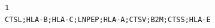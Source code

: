 \documentclass[
  letterpaper,
  DIV=11,
  numbers=noendperiod]{scrartcl}
\begin{document}
\begin{verbatim}
1                                                                                                                                                                                                                                                                                                                                                                                                                                                                                                                                                                                                                                                                                                                                                                                                                                                                                                                                                                                                                                                                                                                                                                                                                                                                                                                                                                                                                                                                                                                                                                                                                                                                                                                                                                                                                                                                                                                                                                                                                                                                                                                                                                                                                                                                                                                                                                                                                                                                                                                                                                                                                                                                                                                                                                                                                                                                                                                                                                                               CTSL;HLA-B;HLA-C;LNPEP;HLA-A;CTSV;B2M;CTSS;HLA-E

\end{verbatim}
\end{document}
